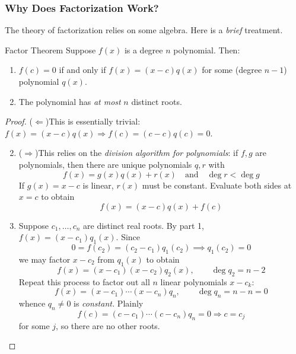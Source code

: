 \subsubsection*{Why Does Factorization Work?}

The theory of factorization relies on some algebra. Here is a \emph{brief} treatment.

\begin{thm}{Factor Theorem}{}
	Suppose $f(x)$ is a degree $n$ polynomial. Then:
	\begin{enumerate}
	  \item $f(c)=0$ if and only if $f(x)=(x-c)q(x)$ for some (degree $n-1$) polynomial $q(x)$.
	  \item The polynomial has \emph{at most} $n$ distinct roots.
	\end{enumerate} 
\end{thm}

\begin{proof}
	\exstart ($\Leftarrow$)\lstsp This is essentially trivial: $f(x)=(x-c)q(x)\Longrightarrow f(c)=(c-c)q(c)=0$.
	\begin{enumerate}\setcounter{enumi}{1}
	  \item[]($\Rightarrow$)\lstsp This relies on the \emph{division algorithm for polynomials}: if $f,g$ are polynomials, then there are unique polynomials $q,r$ with\footnotemark{}
		\[
			f(x)=g(x)q(x)+r(x)\quad \text{and}\quad \deg r<\deg g
		\]
		If $g(x)=x-c$ is linear, $r(x)$ must be constant. Evaluate both sides at $x=c$ to obtain
		\[
			f(x)=(x-c)q(x)+f(c) \tag{thus $f(c)=0\Longrightarrow f(x)=(x-c)q(x)$}
		\]
		\item Suppose $c_1,\ldots,c_n$ are distinct real roots. By part 1, $f(x)=(x-c_1)q_1(x)$. Since
		\[
			0=f(c_2)=(c_2-c_1)q_1(c_2)\implies q_1(c_2)=0
		\]
		we may factor $x-c_2$ from $q_1(x)$ to obtain
		\[
			f(x)=(x-c_1)(x-c_2)q_2(x),\qquad \deg q_2=n-2
		\]
		Repeat this process to factor out all $n$ linear polynomials $x-c_k$:
		\[
			f(x)=(x-c_1)\cdots(x-c_n)q_n,\qquad \deg q_n=n-n=0
		\]
		whence $q_n\neq 0$ is \emph{constant.} Plainly
		\[
			f(c)=(c-c_1)\cdots(c-c_n)q_n=0\Longrightarrow c=c_j
		\]
		for some $j$, so there are no other roots.\qedhere
	\end{enumerate}
\end{proof}

